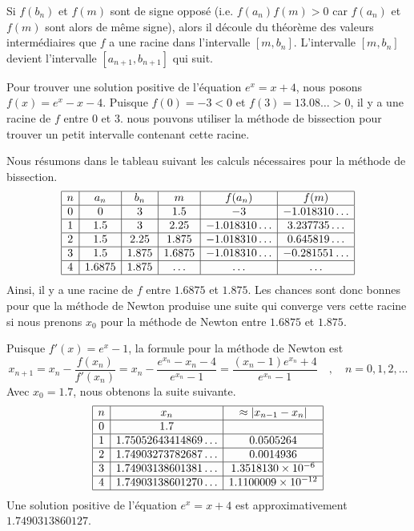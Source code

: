 {Si $f(b_n)$ et $f(m)$ sont de signe opposé (i.e. $f(a_n)f(m)>0$ car
$f(a_n)$ et $f(m)$ sont alors de même signe), alors il découle du
théorème des valeurs intermédiaires que $f$ a une racine dans l'intervalle
$[m,b_n]$.  L'intervalle $[m,b_n]$ devient l'intervalle
$[a_{n+1},b_{n+1}]$ qui suit.

\begin{egg}
Pour trouver une solution positive de l'équation $e^x = x + 4$, nous
posons $f(x) = e^x -x -4$.  Puisque $f(0) = -3<0$ et
$f(3) = 13.08\ldots>0$, il y a une racine de $f$ entre $0$ et $3$.  nous
pouvons utiliser la méthode de bissection pour trouver un petit
intervalle contenant cette racine.

Nous résumons dans le tableau suivant les calculs nécessaires pour la
méthode de bissection.
\[
\begin{array}{|c|c|c|c|c|c|}
\hline
n & a_n & b_n & m & f(a_n) & f(m) \\ \hline
0 & 0 & 3 & 1.5 & -3 & -1.018310\ldots \\ \hline
1 & 1.5 & 3 & 2.25 & -1.018310\ldots & 3.237735\ldots \\ \hline
2 & 1.5 & 2.25 & 1.875 & -1.018310\ldots & 0.645819\ldots \\ \hline
3 & 1.5 & 1.875 & 1.6875 & -1.018310\ldots & -0.281551\ldots \\ \hline
4 & 1.6875 & 1.875 & \ldots & \ldots & \ldots \\ \hline
\end{array}
\]
Ainsi, il y a une racine de $f$ entre $1.6875$ et $1.875$.  Les
chances sont donc bonnes pour que la méthode de Newton produise une
suite qui converge vers cette racine si nous prenons $x_0$ pour la
méthode de Newton entre $1.6875$ et $1.875$.

Puisque $f'(x) = e^x -1$, la formule pour la méthode de Newton est
\[
x_{n+1} = x_n - \frac{f(x_n)}{f'(x_n)}
= x_n - \frac{e^{x_n} - x_n -4}{e^{x_n} - 1}
= \frac{(x_n-1)e^{x_n} +4}{e^{x_n}-1} \quad , \quad n=0,1,2,\ldots
\]
Avec $x_0 = 1.7$, nous obtenons la suite suivante.
\[
\begin{array}{|c|c|c|}
\hline
n & x_n & \approx |x_{n-1}-x_n| \\ \hline
0 & 1.7 & \\ \hline
1 & 1.75052643414869\ldots & 0.0505264 \\ \hline
2 & 1.74903273782687\ldots & 0.0014936 \\ \hline
3 & 1.74903138601381\ldots & 1.3518130\times 10^{-6} \\ \hline
4 & 1.74903138601270\ldots & 1.1100009\times 10^{-12} \\ \hline
\end{array}
\]
Une solution positive de l'équation $e^x = x + 4$ est
approximativement $1.7490313860127$.


\end{egg}}
